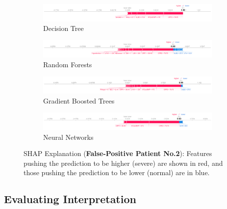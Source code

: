 \begin{figure}
\centering
\begin{subfigure}[b]{1.0\textheight}
    \centering
    \includegraphics[width=\textheight]{figures/chapter_interp/shap_dt_2.png}
    \caption{Decision Tree}
    \label{fig:shap_dt_2}
\end{subfigure}
\hfill
\begin{subfigure}[b]{1.0\textheight}
    \centering
    \includegraphics[width=\textheight]{figures/chapter_interp/shap_rf_2.png}
    \caption{Random Forests}
    \label{fig:shap_rf_2}
\end{subfigure}
\hfill
\begin{subfigure}[b]{1.0\textheight}
    \centering
    \includegraphics[width=\textheight]{figures/chapter_interp/shap_xgbc_2.png}
    \caption{Gradient Boosted Trees}
    \label{fig:shap_xgbc_2}
\end{subfigure}
\hfill
\begin{subfigure}[b]{1.0\textheight}
    \centering
    \includegraphics[width=\textheight]{figures/chapter_interp/shap_nn_2.png}
    \caption{Neural Networks}
    \label{fig:shap_nn_2}
\end{subfigure}
\hfill
\caption{SHAP Explanation (\textbf{False-Positive Patient No.2}): Features pushing the prediction to be higher (severe) are shown in red,  and those pushing the prediction to be lower (normal) are in blue.}
\label{fig:shap_2}
\end{figure}

\clearpage
\subsection{Evaluating Interpretation}

